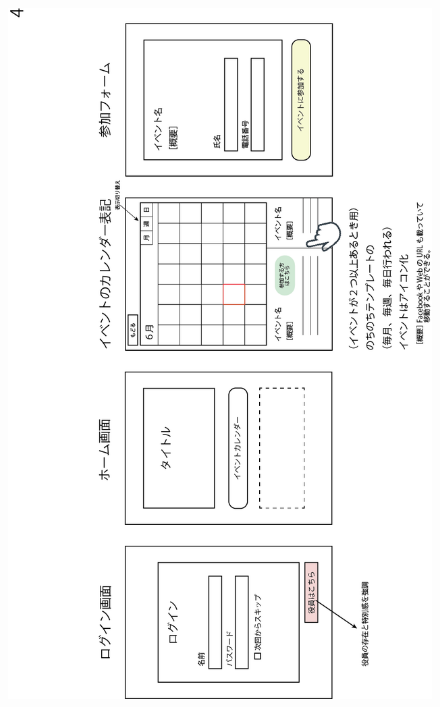 \begin{figure}[ht]
    \begin{center}
    \includegraphics[keepaspectratio, scale=0.8]{appendixs/appendixA_figres/fig4.png}
    \end{center}
\end{figure}

